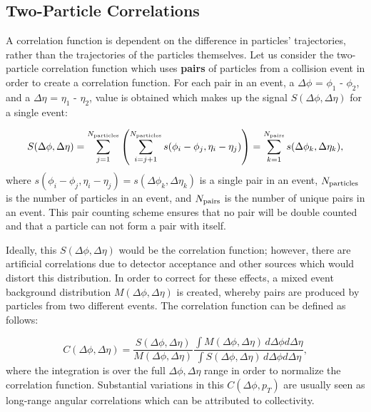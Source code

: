 \subsection{Two-Particle Correlations}

A correlation function is dependent on the difference in particles' trajectories, rather than the trajectories of the particles themselves. Let us consider the two-particle correlation function which uses \textbf{pairs} of particles from a collision event in order to create a correlation function. For each pair in an event, a $\Delta\phi$ = $\phi_1$ - $\phi_2$, and a $\Delta\eta$ = $\eta_1$ - $\eta_2$, value is obtained which makes up the signal $S(\Delta\phi,\Delta\eta)$ for a single event: 

\begin{equation}
  S(\Delta\phi,\Delta\eta) = \sum_{j=1}^{N_{\rm particles}}\left(\sum_{i=j+1}^{N_{\rm particles}}s(\phi_i - \phi_j,\eta_i - \eta_j)\right)=\sum_{k=1}^{N_{\rm pairs}}s(\Delta\phi_k,\Delta\eta_k),
\end{equation}
where $s(\phi_i - \phi_j,\eta_i - \eta_j) = s(\Delta\phi_k,\Delta\eta_k)$ is a single pair in an event, $N_{\rm particles}$ is the number of particles in an event, and $N_{\rm pairs}$ is the number of unique pairs in an event. This pair counting scheme ensures that no pair will be double counted and that a particle can not form a pair with itself.

Ideally, this $S(\Delta\phi,\Delta\eta)$ would be the correlation function; however, there are artificial correlations due to detector acceptance and other sources which would distort this distribution. In order to correct for these effects, a mixed event background distribution $M(\Delta\phi,\Delta\eta)$ is created, whereby pairs are produced by particles from two different events. The correlation function can be defined as follows:

\begin{equation}
  C(\Delta\phi,\Delta\eta) =
          \frac{S(\Delta\phi,\Delta\eta)}{M(\Delta\phi,\Delta\eta)} 
          \frac{\int M(\Delta\phi,\Delta\eta) \, d\Delta\phi d\Delta\eta}{\int S(\Delta\phi,\Delta\eta) \, d\Delta\phi d\Delta\eta},
  \label{eq:def_corr_function}
\end{equation}
where the integration is over the full $\Delta\phi,\Delta\eta$ range in order to normalize the correlation function. Substantial variations in this $C(\Delta\phi,p_T)$ are usually seen as long-range angular correlations which can be attributed to collectivity.

